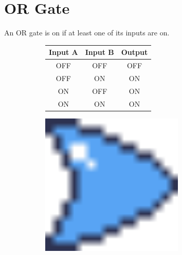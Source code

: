 \documentclass[12pt]{book}
\newcommand{\ON}{\textcolor{on}{ON}}
\newcommand{\OFF}{\textcolor{off}{OFF}}
\begin{document}
		\section{OR Gate}
			An OR gate is on if at least one of its inputs are on.
			\begin{figure}[h]
				\centering
				\begin{subfigure}{0.75\textwidth}
					\begin{tabular}{|c|c|c|}
						\hline
						\textbf{Input A} & \textbf{Input B} & \textbf{Output}\\\hline
						\OFF & \OFF & \OFF\\\hline
						\OFF & \ON & \ON\\\hline
						\ON & \OFF & \ON\\\hline
						\ON & \ON & \ON\\\hline
					\end{tabular}
				\end{subfigure}
				\begin{subfigure}{0.2\textwidth}
					\centering
					\includegraphics[width=0.75\textwidth]{OR}
				\end{subfigure}
			\end{figure}
		\vspace{-20pt}
\end{document}
